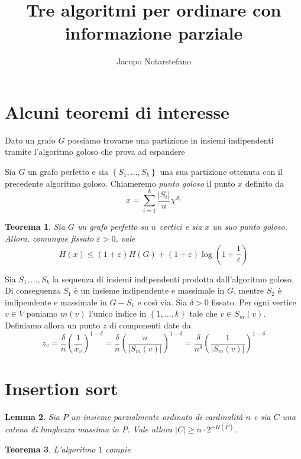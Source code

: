 \documentclass[12pt]{article}
\title{Tre algoritmi per ordinare con informazione parziale}
\author{Jacopo Notarstefano}
\newtheorem{theorem}{Teorema}[section]
\newtheorem{lemma}[theorem]{Lemma}
\newenvironment{proof}[1][Dimostrazione.]{ 
\begin{trivlist}
	\item[\hskip \labelsep {\bfseries #1}]}{ 
\end{trivlist}
}
\newenvironment{definition}[1][Definizione.]{ 
\begin{trivlist}
	\item[\hskip \labelsep {\bfseries #1}]}{ 
\end{trivlist}
}
\begin{document}
\ifpdf {} \else {} \fi

\maketitle

\section{Alcuni teoremi di interesse}

Dato un grafo \(G\) possiamo trovarne una partizione in insiemi indipendenti tramite l'algoritmo goloso che prova ad espandere 
\begin{definition}
	Sia \(G\) un grafo perfetto e sia \(\left\{S_1,\dots,S_k\right\}\) una sua partizione ottenuta con il precedente algoritmo goloso. Chiameremo \emph{punto goloso} il punto \(x\) definito da
	\[x=\sum_{i=1}^k\frac{|S_i|}{n}\chi^{S_i}\]
\end{definition}
\begin{theorem}
	Sia \(G\) un grafo perfetto su \(n\) vertici e sia \(x\) un suo punto goloso. Allora, comunque fissato \(\varepsilon>0\), vale
	\[H(x)\le(1+\varepsilon)H(G)+(1+\varepsilon)\log\left(1+\frac{1}{\varepsilon}\right)\]
\end{theorem}
\begin{proof}
	Sia \(S_1,\dots,S_k\) la sequenza di insiemi indipendenti prodotta dall'algoritmo goloso. Di conseguenza \(S_1\) è un insieme indipendente e massimale in \(G\), mentre \(S_2\) è indipendente e massimale in \(G-S_1\) e così via. Sia \(\delta>0\) fissato. Per ogni vertice \(v\in V\) poniamo \(m(v)\) l'unico indice in \(\left\{1,\dots,k\right\}\) tale che \(v\in S_m(v)\). Definiamo allora un punto \(z\) di componenti date da
	\[z_v=\frac{\delta}{n}\left(\frac{1}{\tilde{x_v}}\right)^{1-\delta}=\frac{\delta}{n}\left(\frac{n}{|S_m(v)|}\right)^{1-\delta}=\frac{\delta}{n^{\delta}}\left(\frac{1}{|S_m(v)|}\right)^{1-\delta}\]
\end{proof}

\section{Insertion sort} 
\begin{lemma}
	Sia \(P\) un insieme parzialmente ordinato di cardinalità \(n\) e sia \(C\) una catena di lunghezza massima in \(P\). Vale allora \(\left|C\right|\ge n\cdot2^{-H(\overline{P})}\). 
\end{lemma}
\begin{theorem}
	L'algoritmo \(1\) compie 
\end{theorem}
\end{document}
